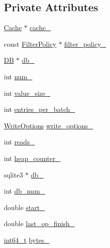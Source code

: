 \subsection*{Private Attributes}
\begin{DoxyCompactItemize}
\item 
\hyperlink{classleveldb_1_1_cache}{Cache} $\ast$ \hyperlink{classleveldb_1_1_benchmark_af051c32dbe15c131de7cd273517b1dfb}{cache\-\_\-}
\item 
const \hyperlink{classleveldb_1_1_filter_policy}{Filter\-Policy} $\ast$ \hyperlink{classleveldb_1_1_benchmark_a805c1ad1596e405c6d5320d618538464}{filter\-\_\-policy\-\_\-}
\item 
\hyperlink{classleveldb_1_1_d_b}{D\-B} $\ast$ \hyperlink{classleveldb_1_1_benchmark_a8583f72650821d4141934eee12b20392}{db\-\_\-}
\item 
int \hyperlink{classleveldb_1_1_benchmark_a26ae7b63ddf6a2836fb807016a588d1c}{num\-\_\-}
\item 
int \hyperlink{classleveldb_1_1_benchmark_a659f2e7f9578b4f8e8adc56da031e193}{value\-\_\-size\-\_\-}
\item 
int \hyperlink{classleveldb_1_1_benchmark_a364560f10183eb31e6c911fd82906843}{entries\-\_\-per\-\_\-batch\-\_\-}
\item 
\hyperlink{structleveldb_1_1_write_options}{Write\-Options} \hyperlink{classleveldb_1_1_benchmark_a0e4811e2580f4777fc4a5c1abb855d62}{write\-\_\-options\-\_\-}
\item 
int \hyperlink{classleveldb_1_1_benchmark_a2e97a6d4ff062a40f1891770b1b54c33}{reads\-\_\-}
\item 
int \hyperlink{classleveldb_1_1_benchmark_a7942968453e5722932880f2f34c00119}{heap\-\_\-counter\-\_\-}
\item 
sqlite3 $\ast$ \hyperlink{classleveldb_1_1_benchmark_a409eeef97e94dddaf33d2185c7dd3ae1}{db\-\_\-}
\item 
int \hyperlink{classleveldb_1_1_benchmark_ae1b5f979a3999e501cbaa1dabf4567c4}{db\-\_\-num\-\_\-}
\item 
double \hyperlink{classleveldb_1_1_benchmark_a626ada583147d77109b593cc8472d1b5}{start\-\_\-}
\item 
double \hyperlink{classleveldb_1_1_benchmark_a407780bf5c322f9f43ad551fbeb1619e}{last\-\_\-op\-\_\-finish\-\_\-}
\item 
\hyperlink{stdint_8h_adec1df1b8b51cb32b77e5b86fff46471}{int64\-\_\-t} \hyperlink{classleveldb_1_1_benchmark_a25cccb81c8110b9976e00af2cc1efc4c}{bytes\-\_\-}
\item 

\end{DoxyCompactItemize}
